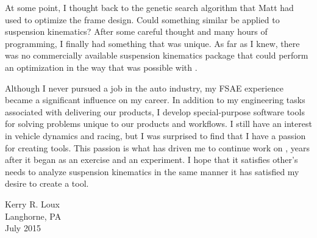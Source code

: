 At some point, I thought back to the genetic search algorithm that Matt had used to optimize the frame design.  Could something similar be applied to suspension kinematics?  After some careful thought and many hours of programming, I finally had something that was unique.  As far as I knew, there was no commercially available suspension kinematics package that could perform an optimization in the way that was possible with \vvase{}.

Although I never pursued a job in the auto industry, my FSAE experience became a significant influence on my career.  In addition to my engineering tasks associated with delivering our products, I develop special-purpose software tools for solving problems unique to our products and workflows.  I still have an interest in vehicle dynamics and racing, but I was surprised to find that I have a passion for creating tools.  This passion is what has driven me to continue work on \vvase{}, years after it began as an exercise and an experiment.  I hope that it satisfies other's needs to analyze suspension kinematics in the same manner it has satisfied my desire to create a tool.




\begin{flushright}
Kerry R. Loux \\
Langhorne, PA \\
July 2015
\end{flushright}
